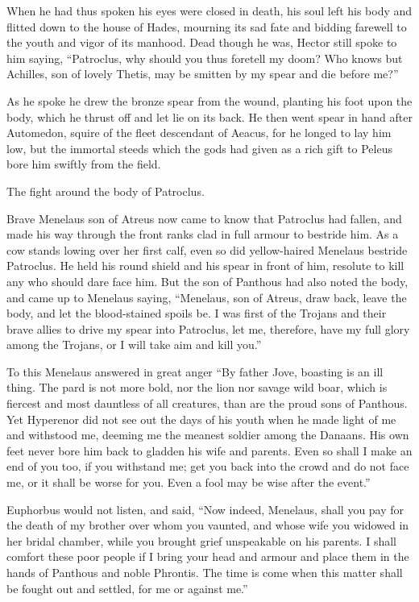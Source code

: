 When he had thus spoken his eyes were closed in death, his soul left his
body and flitted down to the house of Hades, mourning its sad fate and
bidding farewell to the youth and vigor of its manhood. Dead though he
was, Hector still spoke to him saying, “Patroclus, why should you thus
foretell my doom? Who knows but Achilles, son of lovely Thetis, may be
smitten by my spear and die before me?”

As he spoke he drew the bronze spear from the wound, planting his foot
upon the body, which he thrust off and let lie on its back. He then went
spear in hand after Automedon, squire of the fleet descendant of Aeacus,
for he longed to lay him low, but the immortal steeds which the gods had
given as a rich gift to Peleus bore him swiftly from the field.


The fight around the body of Patroclus.

Brave Menelaus son of Atreus now came to know that Patroclus had fallen,
and made his way through the front ranks clad in full armour to bestride
him. As a cow stands lowing over her first calf, even so did yellow-haired
Menelaus bestride Patroclus. He held his round shield and his spear in
front of him, resolute to kill any who should dare face him. But the son
of Panthous had also noted the body, and came up to Menelaus saying,
“Menelaus, son of Atreus, draw back, leave the body, and let the
blood-stained spoils be. I was first of the Trojans and their brave allies
to drive my spear into Patroclus, let me, therefore, have my full glory
among the Trojans, or I will take aim and kill you.”

To this Menelaus answered in great anger “By father Jove, boasting is an
ill thing. The pard is not more bold, nor the lion nor savage wild boar,
which is fiercest and most dauntless of all creatures, than are the proud
sons of Panthous. Yet Hyperenor did not see out the days of his youth when
he made light of me and withstood me, deeming me the meanest soldier among
the Danaans. His own feet never bore him back to gladden his wife and
parents. Even so shall I make an end of you too, if you withstand me; get
you back into the crowd and do not face me, or it shall be worse for you.
Even a fool may be wise after the event.”

Euphorbus would not listen, and said, “Now indeed, Menelaus, shall you pay
for the death of my brother over whom you vaunted, and whose wife you
widowed in her bridal chamber, while you brought grief unspeakable on his
parents. I shall comfort these poor people if I bring your head and armour
and place them in the hands of Panthous and noble Phrontis. The time is
come when this matter shall be fought out and settled, for me or against
me.”

